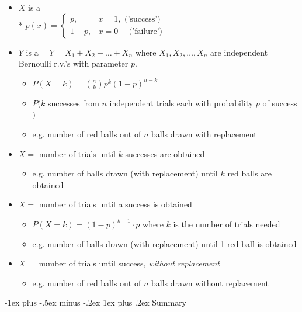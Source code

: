 \documentclass[10pt, landscape]{article}
\makeatletter
\renewcommand{\subsubsection}{\@startsection{subsubsection}{3}{0mm}%
  {-1ex plus -.5ex minus -.2ex}%
  {1ex plus .2ex}%
{\normalfont\small\bfseries}}%
\makeatother
\begin{document}
\begin{multicols*}{3}
  \begin{itemize}
    \item $X$ is a  
      \\* $p(x) = \begin{cases}
        p, &x=1, \text{ ('success')} \\
        1-p, &x=0\quad  \text{ ('failure')}
      \end{cases}$
    \item $ Y $ is a  $ \quad Y = X_1 + X_2 + \dots + X_n $
      where  $ X_1, X_2, \dots, X_n $ are independent Bernoulli r.v.'s with parameter $ p $.
      \begin{itemize}
        \item $ P(X=k) = \binom{n}{k} p^k (1-p)^{n-k} $
        \item $ P(k $ successes from $ n $ independent trials each with probability $ p $ of success$ ) $
        \item e.g. number of red balls out of $ n $ balls drawn with replacement
      \end{itemize}
    \item {} $ X = $ number of trials until $ k $ successes are obtained
      \begin{itemize}
        \item e.g. number of balls drawn (with replacement) until $ k $ red balls are obtained
      \end{itemize}
    \item {} $ X = $ number of trials until a success is obtained
      \begin{itemize}
        \item $ P(X=k) = (1-p)^{k-1} \cdot p $ where $ k $ is the number of trials needed
        \item e.g. number of balls drawn (with replacement) until 1 red ball is obtained
      \end{itemize}
    \item {} $ X = $ number of trials until success, \textit{without replacement}
      \begin{itemize}
        \item e.g. number of red balls out of $ n $ balls drawn without replacement
      \end{itemize}
  \end{itemize}

  \subsubsection{Summary}


\end{multicols*}
\end{document}

